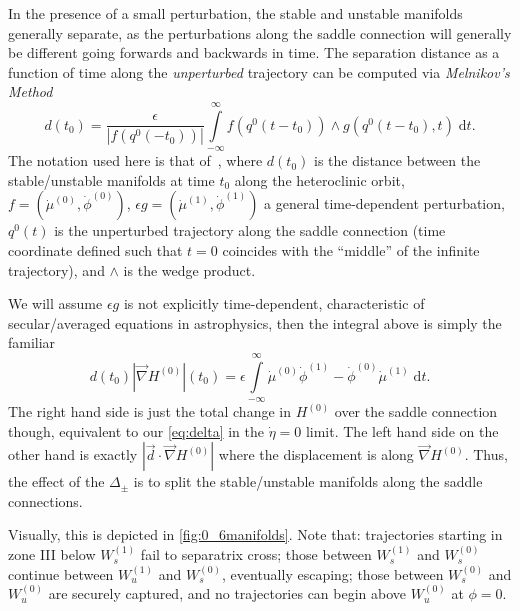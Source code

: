 \documentclass[
        fleqn,
        usenatbib,
    ]{mnras}
\newcommand*{\abs}[1]{\left|#1\right|}
\newcommand*{\p}[1]{\left(#1\right)}
\begin{document}
In the presence of a small perturbation, the stable and unstable manifolds
generally separate, as the perturbations along the saddle connection will
generally be different going forwards and backwards in time. The separation
distance as a function of time along the \emph{unperturbed} trajectory can be
computed via \emph{Melnikov's Method}
\begin{equation}
    d(t_0) = \frac{\epsilon}{\abs{f(q^0(-t_0))}}
        \int\limits_{-\infty}^\infty
            f(q^0(t - t_0)) \wedge g(q^0(t - t_0), t)\;\mathrm{d}t.
\end{equation}
The notation used here is that of~\cite{g_and_h}, where $d(t_0)$ is the distance
between the stable/unstable manifolds at time $t_0$ along the heteroclinic
orbit, $f = \p{\dot{\mu}^{(0)}, \dot{\phi}^{(0)}}$, $\epsilon g =
\p{\dot{\mu}^{(1)}, \dot{\phi}^{(1)}}$ a general time-dependent perturbation,
$q^0(t)$ is the unperturbed trajectory along the saddle connection (time
coordinate defined such that $t = 0$ coincides with the ``middle'' of the
infinite trajectory), and $\wedge$ is the wedge product.

We will assume $\epsilon g$ is not explicitly time-dependent, characteristic of
secular/averaged equations in astrophysics, then the integral above is simply
the familiar
\begin{equation}
    d(t_0) \abs{\vec{\nabla}H^{(0)}}(t_0) = \epsilon \int\limits_{-\infty}^\infty
        \dot{\mu}^{(0)}\dot{\phi}^{(1)} - \dot{\phi}^{(0)}\dot{\mu}^{(1)}
            \;\mathrm{d}t.\label{eq:melnikov}
\end{equation}
The right hand side is just the total change in $H^{(0)}$ over the saddle
connection though, equivalent to our \autoref{eq:delta} in the $\dot{\eta} = 0$
limit. The left hand side on the other hand is exactly $\abs{\vec{d} \cdot
\vec{\nabla}H^{(0)}}$ where the displacement is along $\vec{\nabla}H^{(0)}$.
Thus, the effect of the $\Delta_{\pm}$ is to split the stable/unstable manifolds
along the saddle connections.

Visually, this is depicted in \autoref{fig:0_6manifolds}. Note that:
trajectories starting in zone III below $W_s^{(1)}$ fail to separatrix cross;
those between $W_s^{(1)}$ and $W_s^{(0)}$ continue between $W_u^{(1)}$ and
$W_s^{(0)}$, eventually escaping; those between $W_s^{(0)}$ and $W_u^{(0)}$ are
securely captured, and no trajectories can begin above $W_u^{(0)}$ at $\phi =
0$.
\end{document}
